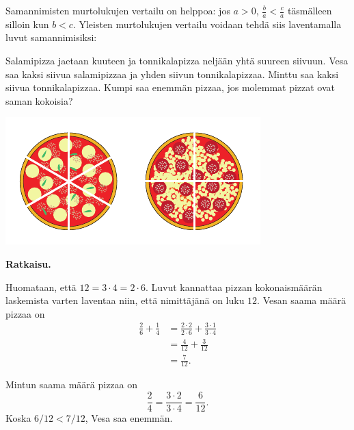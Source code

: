 
Samannimisten murtolukujen vertailu on helppoa: jos $a > 0$, $\frac{b}{a} < \frac{c}{a}$ täsmälleen silloin kun $b < c$. Yleisten murtolukujen
vertailu voidaan tehdä siis laventamalla luvut samannimisiksi:

    
    \begin{esimerkki}
        Salamipizza jaetaan kuuteen ja tonnikalapizza neljään yhtä suureen
        siivuun. Vesa saa kaksi siivua salamipizzaa ja yhden siivun tonnikalapizzaa.
        Minttu saa kaksi siivua tonnikalapizzaa. Kumpi saa enemmän pizzaa, jos
        molemmat pizzat ovat saman kokoisia?
        
        \begin{center}        
          \includegraphics[scale=1.0]{pictures/Kuva3-1-6-pizzat.pdf}
        \end{center}

        \textbf{Ratkaisu.}
        
        Huomataan, että $12 = 3\cdot 4 = 2\cdot 6$. Luvut kannattaa
        pizzan kokonaismäärän laskemista varten laventaa niin, että
        nimittäjänä on luku $12$.
        Vesan saama määrä pizzaa on
        \begin{align*}
           \frac{2}{6} + \frac{1}{4} &= \frac{2\cdot 2}{2\cdot 6} + \frac{3\cdot 1}{3\cdot 4} \\ 
	       							 &= \frac{4}{12}+\frac{3}{12} \\ 
	       							 &= \frac{7}{12}.
        \end{align*}
        
        Mintun saama määrä pizzaa on
        \[
            \frac{2}{4} =
            \frac{3\cdot 2}{3\cdot 4} =
            \frac{6}{12}.
        \]
        Koska $6/12 < 7/12$, Vesa saa enemmän.
    \end{esimerkki}
    
